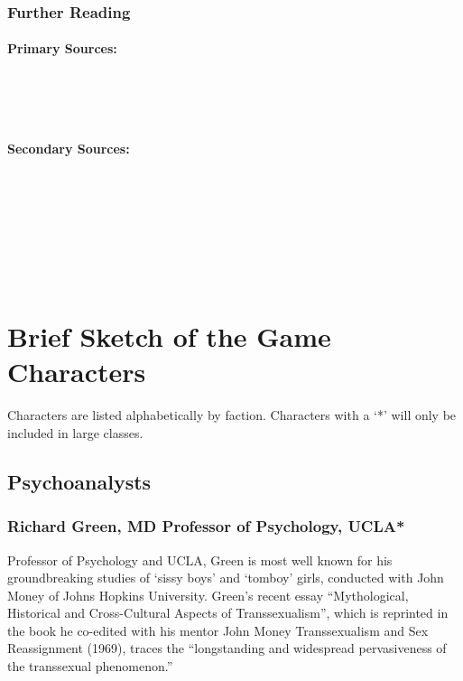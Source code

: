 \begin{refsection}
\subsubsection{Further Reading}
\label{furtherreading}

\paragraph{Primary Sources:}
\label{primarysources:}

~\citep{Miller:1956trb}

~\citep{Miller:1962vk}

\paragraph{Secondary Sources:}
\label{secondarysources:}

~\citep{Bechtel:1999vr}

~\citep{Baars:i5QbNrcs}

~\citep{Leahey:2002tt}

~\citep{Stillings:1995to}

\section{Brief Sketch of the Game Characters}
\label{briefsketchofthegamecharacters}

Characters are listed alphabetically by faction. Characters with a `*' will only be included in large classes.

\subsection{Psychoanalysts}
\label{psychoanalysts}

\subsubsection{Richard Green, MD Professor of Psychology, UCLA*}
\label{richardgreenmdprofessorofpsychologyucla}

Professor of Psychology and UCLA, Green is most well known for his groundbreaking studies of `sissy boys' and `tomboy' girls, conducted with John Money of Johns Hopkins University. Green's recent essay “Mythological, Historical and Cross-Cultural Aspects of Transsexualism”, which is reprinted in the book he co-edited with his mentor John Money Transsexualism and Sex Reassignment (1969), traces the “longstanding and widespread pervasiveness of the transsexual phenomenon.”


\end{refsection}
